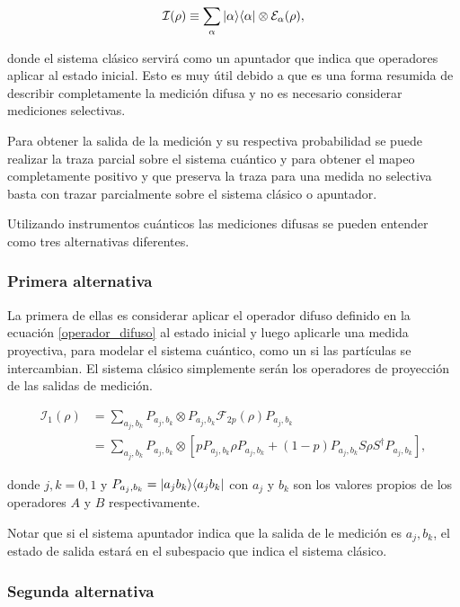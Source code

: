 \begin{equation}
    \mathcal{I}(\rho)\equiv\sum_\alpha |\alpha\rangle \langle\alpha|\otimes \mathcal{E}_\alpha(\rho),
\end{equation}


donde el sistema clásico servirá como un apuntador que indica que operadores aplicar al estado inicial. Esto es muy útil debido a que es una forma resumida de describir completamente la medición difusa y no es necesario considerar mediciones selectivas.


Para obtener la salida de la medición y su respectiva probabilidad se puede realizar la traza parcial sobre el sistema cuántico y para obtener el mapeo completamente positivo y que preserva la traza para una medida no selectiva basta con trazar parcialmente sobre el sistema clásico o apuntador.



Utilizando instrumentos cuánticos las mediciones difusas se pueden entender como tres alternativas diferentes. 

\subsubsection{Primera alternativa}
La primera de ellas es considerar aplicar el operador difuso definido en la ecuación {\ref{operador_difuso}} al estado inicial y luego aplicarle una medida proyectiva, para modelar el sistema cuántico, como un si las partículas se intercambian.
 El sistema clásico simplemente serán los operadores de proyección de las salidas de medición.

\begin{equation}
    \begin{split}
        \mathcal{I}_1(\rho)&=\sum_{a_j,b_k}P_{a_j,b_k}\otimes P_{a_j,b_k} \mathcal{F}_{2p}(\rho) P_{a_j,b_k}\\
        &=\sum_{a_j,b_k}P_{a_j,b_k}\otimes[p P_{a_j,b_k}\rho P_{a_j,b_k}+(1-p)P_{a_j,b_k}S\rho S^\dagger P_{a_j,b_k}],
\end{split}
\end{equation}

donde $j,k=0,1$ y $P_{a_j,b_k}=|a_j b_k\rangle \langle a_j b_k|$ con $a_j$ y $b_k$ son los valores propios de los operadores $A$ y $B$ respectivamente.


Notar que si el sistema apuntador indica que la salida de le medición es $a_j,b_k$, el estado de salida estará en el subespacio que indica el sistema clásico.

\subsubsection{Segunda alternativa}


